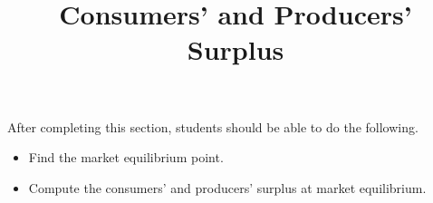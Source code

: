 \documentclass{ximera}
\title{Consumers' and Producers' Surplus}
\begin{document}
\begin{abstract}
\end{abstract}

\maketitle

\begin{sectionOutcomes}

After completing this section, students should be able to do the following.

\begin{itemize}
\item Find the market equilibrium point.
\item Compute the consumers' and producers' surplus at market equilibrium.
\end{itemize}

\end{sectionOutcomes}
\end{document}
